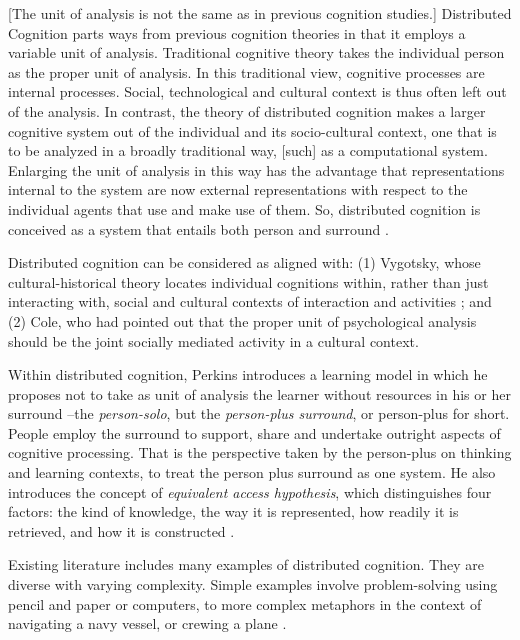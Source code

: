 \documentclass[10pt,twocolumn,ieeetran]{article}
\newcommand{\nota}[1]{{\color{red}[#1]}}
\begin{document}
\nota{The unit of analysis is not the same as in previous cognition studies.} Distributed Cognition parts ways from previous cognition theories in that it employs a variable unit of analysis.  Traditional cognitive theory takes the individual person as the proper unit of analysis.  In this traditional view, cognitive processes are internal processes.  Social, technological and cultural context is thus often left out of the analysis. In contrast, the theory of distributed cognition makes a larger cognitive system out of the individual and its socio-cultural context, one that is to be analyzed in a broadly traditional way, \nota{such} as a computational system. 
Enlarging the unit of analysis in this way has the advantage that representations internal to the system are now external representations with respect to the individual agents that use and make use of them. 
So, distributed cognition is conceived as a system that entails both person and surround \cite{Salomon}.

Distributed cognition can be considered as aligned with: (1) Vygotsky, whose cultural-historical theory \cite{Wertsch} locates individual cognitions within, rather than just interacting with, social and cultural contexts of interaction and activities \cite{Salomon}; and (2) Cole, who had pointed out \cite{Cole} that the proper unit of psychological analysis should be the joint socially mediated activity in a cultural context.


Within distributed cognition, Perkins \cite{Perkins}\cite{Perkins2} introduces a learning model in which he proposes not to take as unit of analysis the learner without resources in his or her surround --the {\it person-solo}, but the {\it person-plus surround}, or person-plus for short. People employ the surround to support, share and undertake outright aspects of cognitive processing. That is the perspective taken by the person-plus on thinking and learning contexts, to treat the person plus surround as one system.
He also introduces the concept of {\it equivalent access hypothesis}, which distinguishes four factors: the kind of knowledge, the way it is represented, how readily it is retrieved, and how it is constructed \cite{Salomon}.

Existing literature includes many examples of distributed cognition. They are diverse with varying complexity. Simple examples involve problem-solving using pencil and paper or computers, to more complex metaphors in the context of navigating a navy vessel, or crewing a plane \cite{Hutchins95}. 
\end{document}

